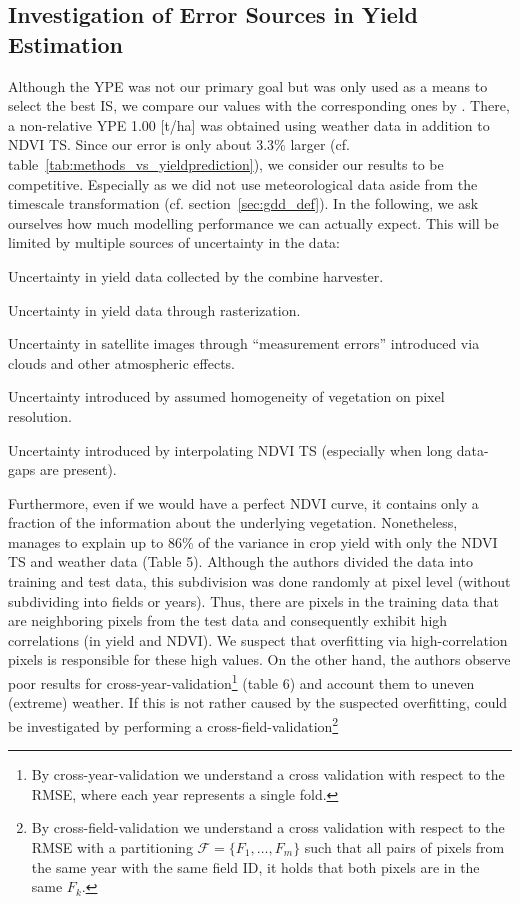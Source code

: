 {    \subsection{Investigation of Error Sources in Yield Estimation}{\label{sec:discuss_high-rmse-in-yield-prdiction}
        Although the YPE was not our primary goal but was only used as a means to select the best IS, we compare our values with the corresponding ones by \cite{perichPixelbasedCropYield2022}. There, a non-relative YPE 1.00 [t/ha] was obtained using weather data in addition to NDVI TS. Since our error is only about 3.3\% larger (cf. table~\ref{tab:methods_vs_yieldprediction}), we consider our results to be competitive. Especially as we did not use meteorological data aside from the timescale transformation (cf. section~\ref{sec:gdd_def}). In the following, we ask ourselves how much modelling performance we can actually expect. This will be limited by multiple sources of uncertainty in the data:
        \begin{Nenumerate}
            \item Uncertainty in yield data collected by the combine harvester.
            \item Uncertainty in yield data through rasterization.
            \item Uncertainty in satellite images through ``measurement errors'' introduced via clouds and other atmospheric effects.
            \item Uncertainty introduced by assumed homogeneity of vegetation on pixel resolution. 
            \item Uncertainty introduced by interpolating NDVI TS (especially when long data-gaps are present).
        \end{Nenumerate}
        Furthermore, even if we would have a perfect NDVI curve, it contains only a fraction of the information about the underlying vegetation. 
        Nonetheless, \cite{perichPixelbasedCropYield2022} manages to explain up to 86\% of the variance in crop yield with only the NDVI TS and weather data (Table 5).  Although the authors divided the data into training and test data, this subdivision was done randomly at pixel level (without subdividing into fields or years). Thus, there are pixels in the training data that are neighboring pixels from the test data and consequently exhibit high correlations (in yield and NDVI). We suspect that overfitting via high-correlation pixels is responsible for these high values. On the other hand, the authors observe poor results for cross-year-validation\footnote{By cross-year-validation we understand a cross validation with respect to the RMSE, where each year represents a single fold.} (table 6) and account them to uneven (extreme) weather.  If this is not rather caused by the suspected overfitting, could be investigated by performing a cross-field-validation\footnote{By cross-field-validation we understand a cross validation with respect to the RMSE with a partitioning $\mathcal{F}=\{F_1,\dots,F_m\}$ such that all pairs of pixels from the same year with the same field ID, it holds that both pixels are in the same $F_k$.} 
}}
